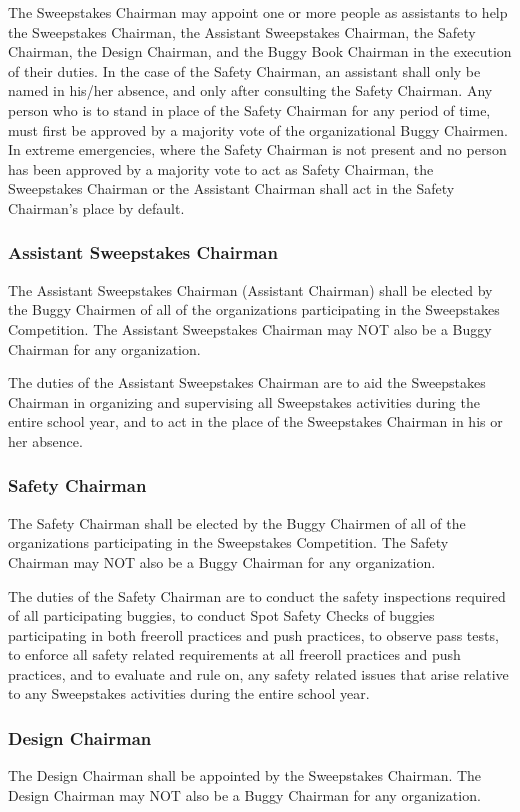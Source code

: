 The Sweepstakes Chairman may appoint one or more people as assistants to help the Sweepstakes Chairman, the Assistant Sweepstakes Chairman, the Safety Chairman, the Design Chairman, and the Buggy Book Chairman in the execution of their duties. In the case of the Safety Chairman, an assistant shall only be named in his/her absence, and only after consulting the Safety Chairman. Any person who is to stand in place of the Safety Chairman for any period of time, must first be approved by a majority vote of the organizational Buggy Chairmen. In extreme emergencies, where the Safety Chairman is not present and no person has been approved by a majority vote to act as Safety Chairman, the Sweepstakes Chairman or the Assistant Chairman shall act in the Safety Chairman's place by default.

\subsubsection{Assistant Sweepstakes Chairman}
The Assistant Sweepstakes Chairman (Assistant Chairman) shall be elected by the Buggy Chairmen of all of the organizations participating in the Sweepstakes Competition. The Assistant Sweepstakes Chairman may NOT also be a Buggy Chairman for any organization.

The duties of the Assistant Sweepstakes Chairman are to aid the Sweepstakes Chairman in organizing and supervising all Sweepstakes activities during the entire school year, and to act in the place of the Sweepstakes Chairman in his or her absence.

\subsubsection{Safety Chairman}
The Safety Chairman shall be elected by the Buggy Chairmen of all of the organizations participating in the Sweepstakes Competition. The Safety Chairman may NOT also be a Buggy Chairman for any organization.

The duties of the Safety Chairman are to conduct the safety inspections required of all participating buggies, to conduct Spot Safety Checks of buggies participating in both freeroll practices and push practices, to observe pass tests, to enforce all safety related requirements at all freeroll practices and push practices, and to evaluate and rule on, any safety related issues that arise relative to any Sweepstakes activities during the entire school year.

\subsubsection{Design Chairman}
The Design Chairman shall be appointed by the Sweepstakes Chairman. The Design Chairman may NOT also be a Buggy Chairman for any organization.

